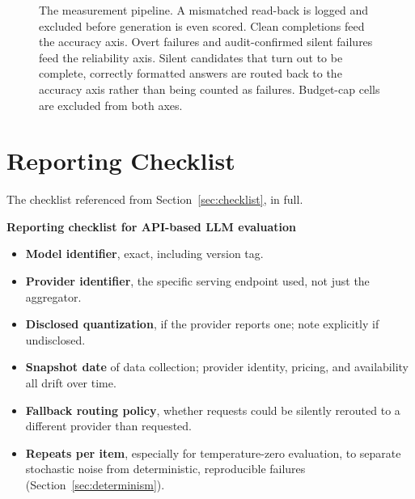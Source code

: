 \documentclass[11pt]{article}
\begin{document}
\begin{figure}[t]
{}
\caption{The measurement pipeline. A mismatched read-back is logged
and excluded before generation is even scored. Clean completions feed
the accuracy axis. Overt failures and audit-confirmed silent failures
feed the reliability axis. Silent candidates that turn out to be
complete, correctly formatted answers are routed back to the accuracy
axis rather than being counted as failures. Budget-cap cells are
excluded from both axes.}
\label{fig:harness}
\end{figure}


\section{Reporting Checklist}
\label{app:checklist}

The checklist referenced from Section~\ref{sec:checklist}, in full.

\begin{mdframed}[linewidth=0.5pt, linecolor=gray!50,
  innerleftmargin=6pt, innerrightmargin=6pt, innertopmargin=3pt,
  innerbottommargin=3pt, backgroundcolor=gray!4]
\small
\textbf{Reporting checklist for API-based LLM evaluation}
\begin{itemize}[leftmargin=*, itemsep=1pt, topsep=2pt]
\item \textbf{Model identifier}, exact, including version tag.
\item \textbf{Provider identifier}, the specific serving endpoint
  used, not just the aggregator.
\item \textbf{Disclosed quantization}, if the provider reports one;
  note explicitly if undisclosed.
\item \textbf{Snapshot date} of data collection; provider identity,
  pricing, and availability all drift over time.
\item \textbf{Fallback routing policy}, whether requests could be
  silently rerouted to a different provider than requested.
\item \textbf{Repeats per item}, especially for temperature-zero
  evaluation, to separate stochastic noise from deterministic,
  reproducible failures (Section~\ref{sec:determinism}).
\end{itemize}
\end{mdframed}
\end{document}
